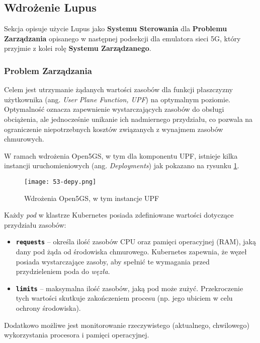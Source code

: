 \subsection{Wdrożenie Lupus}

Sekcja opisuje użycie Lupus jako \textbf{Systemu Sterowania} dla \textbf{Problemu Zarządzania} opisanego w następnej podsekcji dla emulatora sieci 5G, który przyjmie z kolei rolę \textbf{Systemu Zarządzanego}. 

\subsubsection{Problem Zarządzania}

Celem jest utrzymanie żądanych wartości zasobów dla funkcji płaszczyzny użytkownika (ang. \textit{User Plane Function, UPF}) na optymalnym poziomie. Optymalność oznacza zapewnienie wystarczających zasobów do obsługi obciążenia, ale jednocześnie unikanie ich nadmiernego przydziału, co pozwala na ograniczenie niepotrzebnych kosztów związanych z wynajmem zasobów chmurowych.

W ramach wdrożenia Open5GS, w tym dla komponentu UPF, istnieje kilka instancji uruchomieniowych (ang. \textit{Deployments}) jak pokazano na rysunku \ref{fig:53-depy}.


\begin{figure}[!h]
    \centering \texttt{[image: 53-depy.png]}
    \caption{Wdrożenia Open5GS, w tym instancje UPF}\label{fig:53-depy}
\end{figure}

Każdy \textit{pod} w klastrze Kubernetes posiada zdefiniowane wartości dotyczące przydziału zasobów:

\begin{itemize}
    \item \textbf{\texttt{requests}} – określa ilość zasobów CPU oraz pamięci operacyjnej (RAM), jaką dany pod żąda od środowiska chmurowego. Kubernetes zapewnia, że węzeł posiada wystarczające zasoby, aby spełnić te wymagania przed przydzieleniem poda do \textit{węzła}.
    \item \textbf{\texttt{limits}} – maksymalna ilość zasobów, jaką pod może zużyć. Przekroczenie tych wartości skutkuje zakończeniem procesu (np. jego ubiciem w celu ochrony środowiska).
\end{itemize}

Dodatkowo możliwe jest monitorowanie rzeczywistego (aktualnego, chwilowego) wykorzystania procesora i pamięci operacyjnej.

